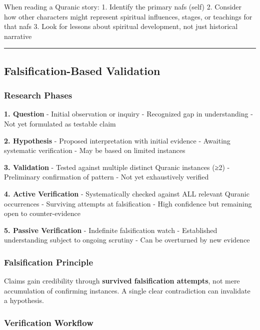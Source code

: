 \documentclass[12pt,a4paper]{article}
\begin{document}
When reading a Quranic story: 1. Identify the primary nafs (self) 2.
Consider how other characters might represent spiritual influences,
stages, or teachings for that nafs 3. Look for lessons about spiritual
development, not just historical narrative

\begin{center}\rule{0.5\linewidth}{0.5pt}\end{center}

\subsection{Falsification-Based
Validation}\label{falsification-based-validation}

\subsubsection{Research Phases}\label{research-phases}

\textbf{1. Question} - Initial observation or inquiry - Recognized gap
in understanding - Not yet formulated as testable claim

\textbf{2. Hypothesis} - Proposed interpretation with initial evidence -
Awaiting systematic verification - May be based on limited instances

\textbf{3. Validation} - Tested against multiple distinct Quranic
instances (≥2) - Preliminary confirmation of pattern - Not yet
exhaustively verified

\textbf{4. Active Verification} - Systematically checked against ALL
relevant Quranic occurrences - Surviving attempts at falsification -
High confidence but remaining open to counter-evidence

\textbf{5. Passive Verification} - Indefinite falsification watch -
Established understanding subject to ongoing scrutiny - Can be
overturned by new evidence

\subsubsection{Falsification Principle}\label{falsification-principle}

Claims gain credibility through \textbf{survived falsification
attempts}, not mere accumulation of confirming instances. A single clear
contradiction can invalidate a hypothesis.

\subsubsection{Verification Workflow}\label{verification-workflow}
\end{document}

